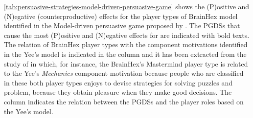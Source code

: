 \autoref{tab:persuasive-strategies-model-driven-persuasive-game} shows the (P)ositive and (N)egative (counterproductive) effects for the player types of BrainHex model identified in the Model-driven persuasive game proposed by .
The PGDSs that cause the most (P)ositive and (N)egative effects for are indicated with bold texts.
The relation of BrainHex player types with the component motivations identified in the Yee's model is indicated in the column  and it has been extracted from the study of  in which, for instance, the BrainHex's Mastermind player type is related to the Yee's \emph{Mechanics} component motivation because people who are classified in these both player types enjoys to devise strategies for solving puzzles and problem, because they obtain pleasure when they make good decisions.
The column  indicates the relation between the PGDSs and the player roles based on the Yee's model.


